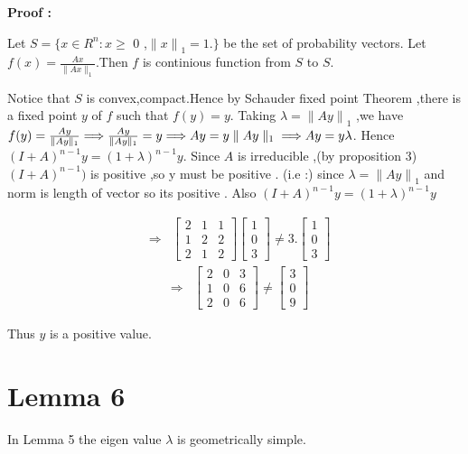 {\bf Proof :} 

Let $S =\{ x \in R^{n} : x \geq $ 0 ,${\parallel    x \parallel }_{1} = 1.\}$ be the set of probability vectors.
Let $f(x) =\frac{ Ax }{\parallel Ax \parallel_{1}}$.Then $f$ is continious function from $S$ to $S$.

 Notice that $S$ is convex,compact.Hence by Schauder fixed point Theorem ,there is a fixed point $y$ of $f$ such that $f(y)= y$.
 Taking $\lambda = {\parallel Ay \parallel}_{1}$ ,we have $f(y) = \frac{ Ay }{\parallel Ay \parallel_{1}}
\\ \Longrightarrow  \frac{ Ay }{\parallel Ay \parallel_{1}}=  y  
\\  \Longrightarrow  Ay = y  \parallel Ay \parallel _{1} 
\\ \Longrightarrow  Ay = y \lambda $.
 Hence $(I + A)^{n-1} y  = (1 + \lambda  )^{n-1} y$.
 Since $A$ is irreducible ,(by proposition 3) $(I + A)^{n-1})$ is positive ,so y must be positive .
 (i.e :)
since $\lambda = {\parallel   Ay \parallel }_{1} $ and norm is length of vector so its positive .
Also $(I+A)^{n-1}y = (1+ \lambda )^{n-1}y$  


\begin{eqnarray*}& \Longrightarrow &
\begin{bmatrix}2&1&1\\1&2&2\\2&1&2\end{bmatrix}
\begin{bmatrix}1\\0\\3\end{bmatrix} 
\neq 3.
\begin{bmatrix}1\\0\\3\end{bmatrix} 
\end{eqnarray*}
\begin{eqnarray*}& \Longrightarrow &
\begin{bmatrix}2&0&3\\1&0&6\\2&0&6\end{bmatrix}
\neq
\begin{bmatrix}3\\0\\9\end{bmatrix} 
\end{eqnarray*}

Thus $y$ is a positive value.
  
  
\section{Lemma 6}
In Lemma 5 the eigen value $\lambda $ is geometrically simple.

